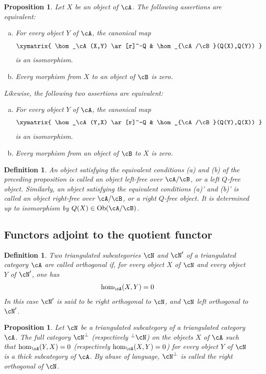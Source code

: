 \documentclass[12pt,oneside,english]{smfbook}
\newtheorem{proposition}[subsubsection]{Proposition}
\newtheorem{definition}[subsubsection]{Definition}
\begin{document}
\begin{proposition}\label{VIII:2-5-3}
Let $X$ be an object of $\cA$. The following assertions are equivalent:
\begin{enumerate}[(a)]
  \item For every object $Y$ of $\cA$, the canonical map
    \[\xymatrix{
      \hom_\cA(X,Y) \ar[r]^-Q
        & \hom_{\cA/\cB}(Q(X),Q(Y))
    }\]
    is an isomorphism.
  \item Every morphism from $X$ to an object of $\cB$ is zero.
\end{enumerate}
Likewise, the following two assertions are equivalent:
\begin{enumerate}[(a)']
  \item For every object $Y$ of $\cA$, the canonical map
    \[\xymatrix{
      \hom_\cA(Y,X) \ar[r]^-Q
        & \hom_{\cA/\cB}(Q(Y),Q(X))
    }\]
    is an isomorphism.
  \item Every morphism from an object of $\cB$ to $X$ is zero.
\end{enumerate}
\end{proposition}

\begin{definition}\label{VIII:2-5-4}
An object satisfying the equivalent conditions (a) and (b) of the preceding proposition is called an \emph{object left-free over $\cA/\cB$}, or a \emph{left $Q$-free object}. Similarly, an object satisfying the equivalent conditions (a)' and (b)' is called an \emph{object right-free over $\cA/\cB$}, or a \emph{right $Q$-free object}. It is determined up to isomorphism by $Q(X)\in\operatorname{Ob}(\cA/\cB)$.
\end{definition}

\subsection{Functors adjoint to the quotient functor}\label{VIII:2-6}

\begin{definition}\label{VIII:2-6-1}
Two triangulated subcategories $\cN$ and $\cN'$ of a triangulated category $\cA$ are called \emph{orthogonal} if, for every object $X$ of $\cN$ and every object $Y$ of $\cN'$, one has
\[
  \hom_\cA(X,Y) = 0
\]
In this case $\cN'$ is said to be right orthogonal to $\cN$, and $\cN$ left orthogonal to $\cN'$.
\end{definition}

\begin{proposition}\label{VIII:2-6-2}
Let $\cN$ be a triangulated subcategory of a triangulated category $\cA$. The full category $\cN^\bot$ (respectively $^\bot\cN$) on the objects $X$ of $\cA$ such that $\hom_\cA(Y,X)=0$ (respectively $\hom_\cA(X,Y)=0$) for every object $Y$ of $\cN$ is a thick subcategory of $\cA$. By abuse of language, $\cN^\bot$ is called the right orthogonal of $\cN$.
\end{proposition}
\end{document}
